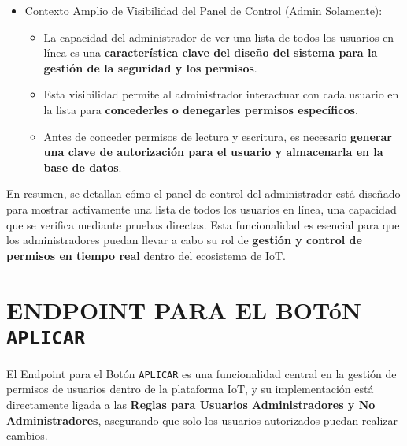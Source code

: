 \documentclass{report}
\begin{document}
\begin{itemize}
    \item Contexto Amplio de Visibilidad del Panel de Control (Admin Solamente):
    \begin{itemize}
        \item La capacidad del administrador de ver una lista de todos los usuarios en línea es una \textbf{característica clave del diseño del sistema para 
              la gestión de la seguridad y los permisos}.
        \item Esta visibilidad permite al administrador interactuar con cada usuario en la lista para \textbf{concederles o denegarles permisos específicos}.
        \item Antes de conceder permisos de lectura y escritura, es necesario \textbf{generar una clave de autorización para el usuario y almacenarla en la 
              base de datos}.
    \end{itemize}
\end{itemize}

En resumen, se  detallan cómo el panel de control del administrador está diseñado para mostrar activamente una lista de todos los usuarios en 
línea, una capacidad que se verifica mediante pruebas directas. Esta funcionalidad es esencial para que los administradores puedan llevar a cabo su rol 
de \textbf{gestión y control de permisos en tiempo real} dentro del ecosistema de IoT.

\section{ENDPOINT PARA EL BOTóN \texttt{APLICAR}}
El Endpoint para el Botón \texttt{APLICAR} es una funcionalidad central en la gestión de permisos de usuarios dentro de la plataforma IoT, y su 
implementación está directamente ligada a las \textbf{Reglas para Usuarios Administradores y No Administradores}, asegurando que solo los usuarios autorizados 
puedan realizar cambios.
\end{document}
